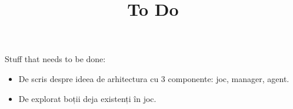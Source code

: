 \documentclass{article}
\title{To Do}
\begin{document}
\maketitle

Stuff that needs to be done:
\begin{itemize}
    \item De scris despre ideea de arhitectura cu 3 componente: joc, manager, agent.
    \item De explorat boții deja existenți în joc.
\end{itemize}
\end{document}
